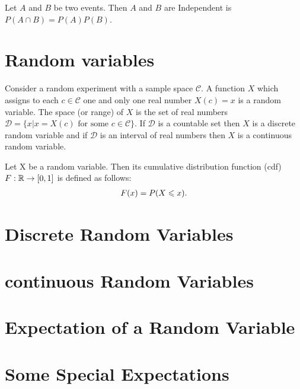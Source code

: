 \begin{definition}{}{}
    Let $A$ and $B$ be two events. Then $A$ and $B$ are Independent is $P(A\cap B)=P(A)P(B)$.
\end{definition}

\section{Random variables}

\begin{definition}{}{}
    Consider a random experiment with a sample space $\mathcal{C}$.
    A function $X$ which assigns to each $c\in\mathcal{C}$ one and only one real number $X(c)=x$ is
    a random variable. The space (or range) of $X$ is the set of real numbers $\mathcal{D}=\{x|x=X(c) \text{ for some } c\in \mathcal{C}\}$.
    If $\mathcal{D}$ is a countable set then $X$ is a discrete random variable and 
    if $\mathcal{D}$ is an interval of real numbers then $X$ is a continuous random variable.
\end{definition}

\begin{definition}{}{}
    Let X be a random variable. 
    Then its cumulative distribution function (cdf) $F:\mathbb{R}\rightarrow [0,1]$
    is defined as follows:
    \begin{align*}
        F(x) = P(X\leqslant x).
    \end{align*}
\end{definition}

\begin{theorem}{}{}
    
\end{theorem}

\section{Discrete Random Variables}

\section{continuous Random Variables}

\section{Expectation of a Random Variable}

\section{Some Special Expectations}
